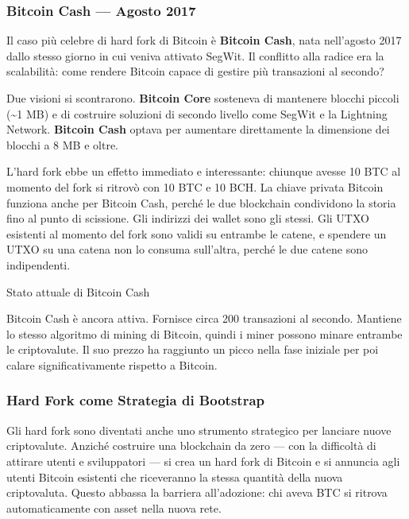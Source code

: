 \documentclass[
  italian,
  openany]{book}
\begin{document}
\subsubsection{Bitcoin Cash --- Agosto
2017}\label{bitcoin-cash-agosto-2017}

Il caso più celebre di hard fork di Bitcoin è \textbf{Bitcoin Cash},
nata nell'agosto 2017 dallo stesso giorno in cui veniva attivato SegWit.
Il conflitto alla radice era la scalabilità: come rendere Bitcoin capace
di gestire più transazioni al secondo?

Due visioni si scontrarono. \textbf{Bitcoin Core} sosteneva di mantenere
blocchi piccoli (\textasciitilde1 MB) e di costruire soluzioni di
secondo livello come SegWit e la Lightning Network. \textbf{Bitcoin
Cash} optava per aumentare direttamente la dimensione dei blocchi a 8 MB
e oltre.

L'hard fork ebbe un effetto immediato e interessante: chiunque avesse 10
BTC al momento del fork si ritrovò con 10 BTC e 10 BCH. La chiave
privata Bitcoin funziona anche per Bitcoin Cash, perché le due
blockchain condividono la storia fino al punto di scissione. Gli
indirizzi dei wallet sono gli stessi. Gli UTXO esistenti al momento del
fork sono validi su entrambe le catene, e spendere un UTXO su una catena
non lo consuma sull'altra, perché le due catene sono indipendenti.

\begin{calloutnote}{Stato attuale di Bitcoin Cash}

Bitcoin Cash è ancora attiva. Fornisce circa 200 transazioni al secondo.
Mantiene lo stesso algoritmo di mining di Bitcoin, quindi i miner
possono minare entrambe le criptovalute. Il suo prezzo ha raggiunto un
picco nella fase iniziale per poi calare significativamente rispetto a
Bitcoin.

\end{calloutnote}

\subsubsection{Hard Fork come Strategia di
Bootstrap}\label{hard-fork-come-strategia-di-bootstrap}

Gli hard fork sono diventati anche uno strumento strategico per lanciare
nuove criptovalute. Anziché costruire una blockchain da zero --- con la
difficoltà di attirare utenti e sviluppatori --- si crea un hard fork di
Bitcoin e si annuncia agli utenti Bitcoin esistenti che riceveranno la
stessa quantità della nuova criptovaluta. Questo abbassa la barriera
all'adozione: chi aveva BTC si ritrova automaticamente con asset nella
nuova rete.
\end{document}
